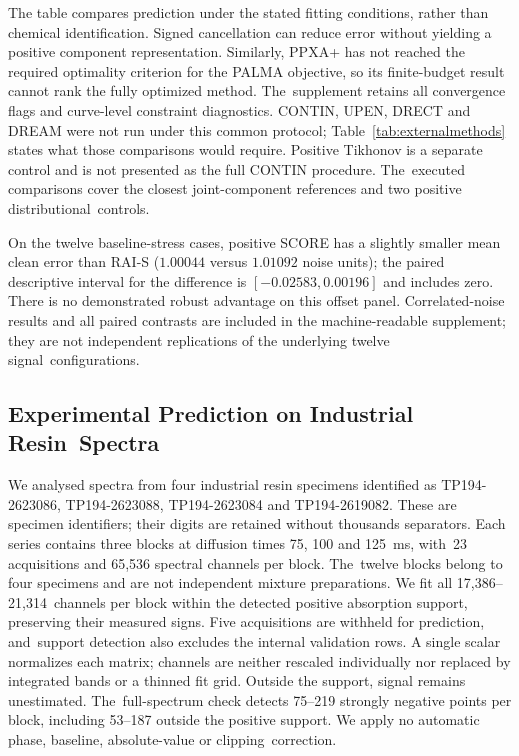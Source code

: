 \documentclass[mathematics,article,accept,moreauthors]{Definitions/mdpi}
\begin{document}
The table compares prediction under the stated fitting conditions, rather than
chemical identification. Signed cancellation can reduce error without yielding
a positive component representation. Similarly, PPXA+ has not reached the required
optimality criterion for the PALMA objective, so its finite-budget result cannot
rank the fully optimized method. The~supplement retains all convergence flags
and curve-level constraint diagnostics. CONTIN, UPEN, DRECT and DREAM were not
run under this common protocol; Table~\ref{tab:externalmethods} states what those
comparisons would require. Positive Tikhonov is a separate control and is not
presented as the full CONTIN procedure. The~executed comparisons cover the
closest joint-component references and two positive distributional~controls.

On the twelve baseline-stress cases, positive SCORE has a slightly smaller
mean clean error than RAI-S ($1.00044$ versus $1.01092$ noise units); the
paired descriptive interval for the difference is $[-0.02583,0.00196]$ and
includes zero. There is no demonstrated robust advantage on this offset
panel. Correlated-noise results and all paired contrasts are included in
the machine-readable supplement; they are not independent replications of
the underlying twelve signal~configurations.


\subsection{Experimental Prediction on Industrial Resin~Spectra}\label{app:experimentalrevision}
We analysed spectra from four industrial resin specimens identified as TP194-2623086, TP194-2623088, TP194-2623084 and TP194-2619082. These are specimen identifiers; their digits are retained without thousands separators. 
 Each series contains three blocks at diffusion times 75, 100
and 125~ms, with~23 acquisitions and 65,536 spectral channels per block. The~twelve
blocks belong to four specimens and are not independent mixture preparations.
We fit all \mbox{17,386--21,314 channels} per block within the detected positive absorption
support, preserving their measured signs. Five acquisitions are withheld for
prediction, and~support detection also excludes the internal validation rows.
A single scalar normalizes each matrix; channels are neither rescaled individually
nor replaced by integrated bands or a thinned fit grid. Outside the support,
signal remains unestimated. The~full-spectrum check detects 75--219 strongly
negative points per block, including 53--187 outside the positive support.
We apply no automatic phase, baseline, absolute-value or clipping~correction.
\end{document}
